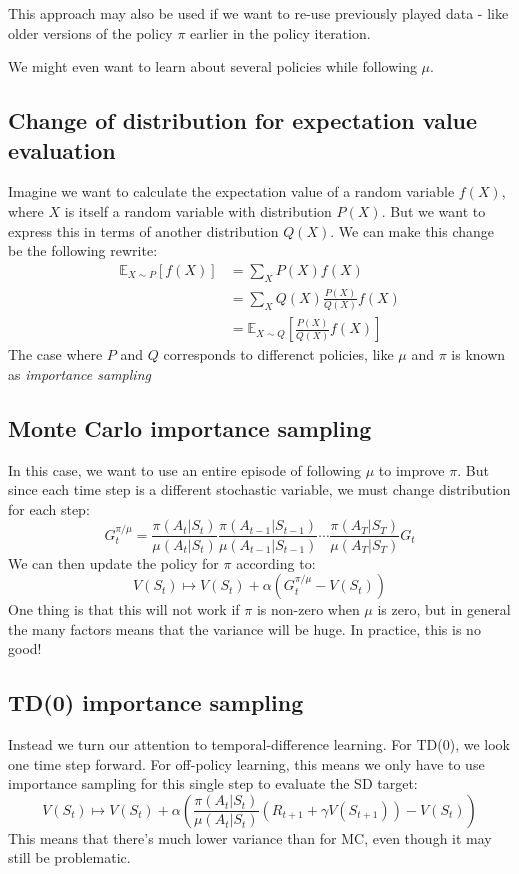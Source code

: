 \documentclass[12pt, a4paper]{article}
\numberwithin{equation}{section}
\begin{document}
This approach may also be used if we want to re-use previously played data - like older versions of the policy $\pi$ earlier in the policy iteration.

We might even want to learn about several policies while following $\mu$.

\subsection{Change of distribution for expectation value evaluation}
Imagine we want to calculate the expectation value of a random variable $f(X)$, where $X$ is itself a random variable with distribution $P(X)$. But we want to express this in terms of another distribution $Q(X)$. We can make this change be the following rewrite:
\begin{align}
\mathbb{E}_{X\sim P}[f(X)]&=\sum_X P(X)f(X)\\
&=\sum_X Q(X)\frac{P(X)}{Q(X)}f(X)\\
&=\mathbb{E}_{X\sim Q}\left[\frac{P(X)}{Q(X)}f(X)\right]
\end{align}
The case where $P$ and $Q$ corresponds to differenct policies, like $\mu$ and $\pi$ is known as \textit{importance sampling}

\subsection{Monte Carlo importance sampling}
In this case, we want to use an entire episode of following $\mu$ to improve $\pi$. But since each time step is a different stochastic variable, we must change distribution for each step:
\begin{equation}
G_t^{\pi/\mu}=\frac{\pi(A_t|S_t)}{\mu(A_t|S_t)}\frac{\pi(A_{t-1}|S_{t-1})}{\mu(A_{t-1}|S_{t-1})}\cdots\frac{\pi(A_T|S_T)}{\mu(A_T|S_T)}G_t
\end{equation}
We can then update the policy for $\pi$ according to:
\begin{equation}
V(S_t)\mapsto V(S_t)+\alpha(G_t^{\pi/\mu}-V(S_t))
\end{equation}
One thing is that this will not work if $\pi$ is non-zero when $\mu$ is zero, but in general the many factors means that the variance will be huge. In practice, this is no good!

\subsection{TD(0) importance sampling}
Instead we turn our attention to temporal-difference learning. For TD(0), we look one time step forward. For off-policy learning, this means we only have to use importance sampling for this single step to evaluate the SD target:
\begin{equation}
V(S_t)\mapsto V(S_t)+\alpha\left(\frac{\pi(A_t|S_t)}{\mu(A_t|S_t)}(R_{t+1}+\gamma V(S_{t+1}))-V(S_t)\right)
\end{equation}
This means that there's much lower variance than for MC, even though it may still be problematic.
\end{document}
